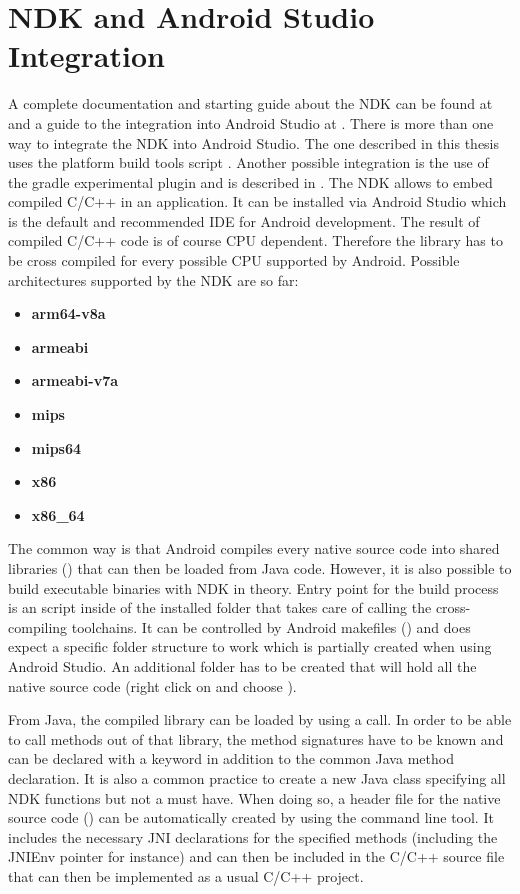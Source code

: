 \section{NDK and Android Studio Integration}\label{section:ndk_integration}
A complete documentation and starting guide about the NDK can be found at \parencite{ndk} and a guide to the integration into Android Studio at \parencite{ndk_integration}.
There is more than one way to integrate the NDK into Android Studio. The one described
in this thesis uses the platform build tools script . Another possible
integration is the use of the gradle experimental plugin and is described in \parencite{gradle_experimental}.
The NDK allows to embed compiled C/C++ in an application. It can be installed via Android Studio which is the default and recommended IDE for Android development.
The result of compiled C/C++ code is of course CPU dependent. Therefore the library has to be cross compiled for
every possible CPU supported by Android. Possible architectures supported by the NDK are so far:
\begin{itemize}
\item \textbf{arm64-v8a}
\item \textbf{armeabi}
\item \textbf{armeabi-v7a}
\item \textbf{mips}
\item \textbf{mips64}
\item \textbf{x86}
\item \textbf{x86\_64}
\end{itemize}
The common way is that Android compiles every native source code into shared libraries
() that can then be loaded from Java code. However, it is also possible to build executable binaries with NDK in theory. Entry point for the build process is an  script inside of the installed  folder that takes care of calling the cross-compiling toolchains. It can be controlled by Android makefiles () and does
expect a specific folder structure to work which is partially created when using Android Studio. An additional  folder has to be created that will hold all the native source code (right click on  and choose ).

From Java, the compiled library can be loaded by using a
 call. In order to be able to call methods out
of that library, the method signatures have to be known and can be declared with
a  keyword in addition to the common Java method declaration. It is also a
common practice to create a new Java class specifying all NDK functions but not a must have. When doing so, a header file for the native source code () can be automatically
created by using the  command line tool. It includes the necessary JNI
declarations for the specified methods (including the JNIEnv pointer for instance)
and can then be included in the C/C++ source file that can then be implemented as a
usual C/C++ project.

